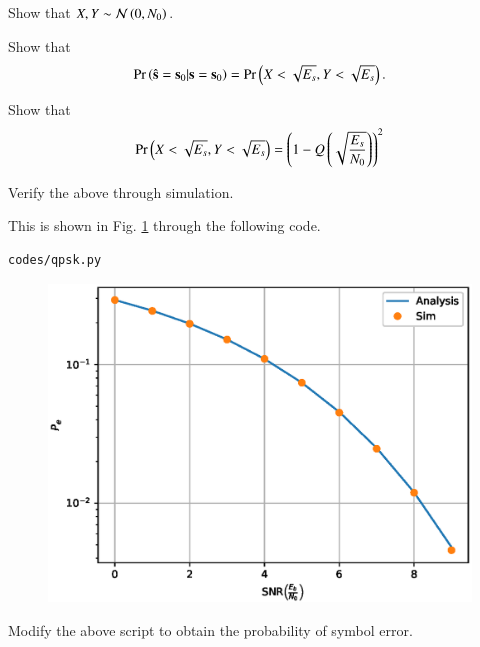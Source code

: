 \documentclass[journal,12pt,twocolumn]{IEEEtran}
\begin{document}
\begin{problem}
Show that $X,Y \sim \mathcal{N}\left(0,N_0\right)$.
\end{problem}
\begin{problem}
Show that 
\begin{equation}
\Pr\left(\hat{\mathbf{s}} = \mathbf{s}_0|\mathbf{s} = \mathbf{s}_0\right) =\Pr\left( X < \sqrt{E_s},  Y < \sqrt{E_s}\right).
\end{equation}
\end{problem}
\begin{problem}
Show that 
\begin{equation}
\Pr\left( X < \sqrt{E_s},  Y < \sqrt{E_s}\right) = \left(1-Q\left(\sqrt{\frac{E_s}{N_0}}\right)\right)^2
\end{equation}
\end{problem}
\begin{problem}
Verify the above through simulation.
\end{problem}
\solution 
This is shown in Fig. \ref{fig:qpsk} through the following code.
\begin{lstlisting}
codes/qpsk.py
\end{lstlisting}
%
\begin{figure}[!h]
\centering
\includegraphics[width=\columnwidth]{./figs/qpsk.eps}
\caption{}
\label{fig:qpsk}
\end{figure}
\begin{problem}
Modify the above script to obtain the probability of symbol error.
\end{problem}
\end{document}
